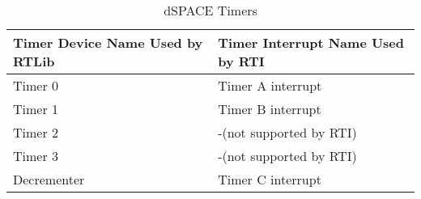 \begin{table}[!h]
    \centering
        \begin{tabularx}{\textwidth}{ 
        | >{\raggedright\arraybackslash}X 
        | >{\raggedright\arraybackslash}X |}
        \hline
        \rowcolor[HTML]{34CDF9}\textbf{Timer Device Name Used by RTLib} & \textbf{Timer Interrupt Name Used by RTI} \\
        \hline
        Timer 0  & Timer A interrupt \\
        Timer 1  & Timer B interrupt \\
        Timer 2  & -(not supported by RTI) \\
        Timer 3  & -(not supported by RTI) \\
        Decrementer  & Timer C interrupt \\
        \hline
        \end{tabularx}
    \caption{dSPACE Timers}
    \label{TimerNames}
\end{table}